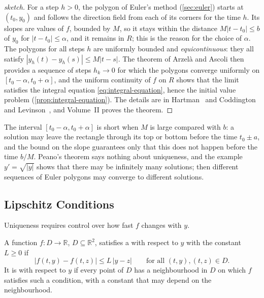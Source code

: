 \begin{proof}[sketch]
For a step $h>0$, the polygon of Euler's method (\cref{sec:euler}) starts at $(t_0,y_0)$ and follows the direction field from each of its corners for the time $h$. Its slopes are values of $f$, bounded by $M$, so it stays within the distance $M|t-t_0|\le b$ of $y_0$ for $|t-t_0|\le\alpha$, and it remains in $R$; this is the reason for the choice of $\alpha$. The polygons for all steps $h$ are uniformly bounded and \emph{equicontinuous}: they all satisfy $|y_h(t)-y_h(s)|\le M|t-s|$. The theorem of Arzel\`a and Ascoli then provides a sequence of steps $h_k\to0$ for which the polygons converge uniformly on $[t_0-\alpha,t_0+\alpha]$, and the uniform continuity of $f$ on $R$ shows that the limit satisfies the integral equation \eqref{eq:integral-equation}, hence the initial value problem (\cref{prop:integral-equation}). The details are in Hartman~\cite[Chap.~II]{hartman2002} and Coddington and Levinson~\cite[Chap.~1]{coddington1955}, and Volume~II proves the theorem.
\end{proof}

The interval $[t_0-\alpha,t_0+\alpha]$ is short when $M$ is large compared with $b$: a solution may leave the rectangle through its top or bottom before the time $t_0\pm a$, and the bound on the slope guarantees only that this does not happen before the time $b/M$. Peano's theorem says nothing about uniqueness, and the example $y'=\sqrt{|y|}$ shows that there may be infinitely many solutions; then different sequences of Euler polygons may converge to different solutions.

\subsection{Lipschitz Conditions}

Uniqueness requires control over how fast $f$ changes with $y$.

\begin{definition}
\label{def:lipschitz-y}
A function $f\colon D\to\mathbb R$, $D\subseteq\mathbb R^2$, satisfies a  with respect to $y$ with the constant $L\ge0$ if
\[
|f(t,y)-f(t,z)|\le L\,|y-z|\qquad\text{for all }(t,y),(t,z)\in D .
\]
It is  with respect to $y$ if every point of $D$ has a neighbourhood in $D$ on which $f$ satisfies such a condition, with a constant that may depend on the neighbourhood.
\end{definition}

